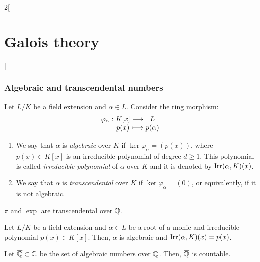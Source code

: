 \documentclass[../../../main_math.tex]{subfiles}
\begin{document}
\begin{multicols}{2}[\section{Galois theory}]
  \subsubsection{Algebraic and transcendental numbers}
  \begin{definition}
    Let $L/K$ be a field extension and $\alpha\in L$. Consider the ring morphism: $$\function{\varphi_\alpha}{K[x]}{L}{p(x)}{p(\alpha)}$$
    \begin{enumerate}
      \item We say that $\alpha$ is \emph{algebraic} over $K$ if $\ker\varphi_\alpha=(p(x))$, where $p(x)\in K[x]$ is an irreducible polynomial of degree $d\geq 1$. This polynomial is called \emph{irreducible polynomial} of $\alpha$ over $K$ and it is denoted by $\operatorname{Irr}(\alpha,K)(x)$.
      \item We say that $\alpha$ is \emph{transcendental} over $K$ if $\ker\varphi_\alpha=(0)$, or equivalently, if it is not algebraic.
    \end{enumerate}
  \end{definition}
  \begin{proposition}
    $\pi$ and $\exp{}$ are transcendental over $\mathbb{Q}$.
  \end{proposition}
  \begin{proposition}
    Let $L/K$ be a field extension and $\alpha\in L$ be a root of a monic and irreducible polynomial $p(x)\in K[x]$. Then, $\alpha$ is algebraic and $\operatorname{Irr}(\alpha,K)(x)=p(x)$.
  \end{proposition}
  \begin{theorem}
    Let $\overline{\mathbb{Q}}\subset\mathbb{C}$ be the set of algebraic numbers over $\mathbb{Q}$. Then, $\overline{\mathbb{Q}}$ is countable.
  \end{theorem}

\end{multicols}
\end{document}
